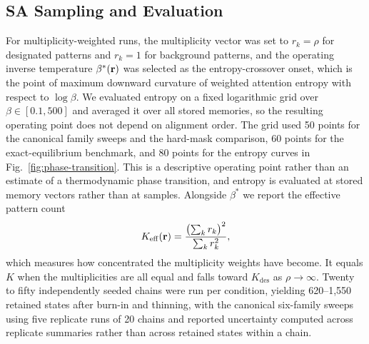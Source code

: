 \subsection{SA Sampling and Evaluation}

For multiplicity-weighted runs, the multiplicity vector was set to $r_k = \rho$ for designated
patterns and $r_k = 1$ for background patterns, and the operating inverse temperature
$\beta^{*}(\mathbf{r})$ was selected as the entropy-crossover onset, which is the point of maximum
downward curvature of weighted attention entropy with respect to $\log\beta$. We evaluated
entropy on a fixed logarithmic grid over $\beta\in[0.1,500]$ and averaged it over all stored
memories, so the resulting operating point does not depend on alignment order. The grid used 50 points
for the canonical family sweeps and the hard-mask comparison, 60 points for the exact-equilibrium
benchmark, and 80 points for the entropy curves in Fig.~\ref{fig:phase-transition}. This is a
descriptive operating point rather than an estimate of a thermodynamic phase transition, and
entropy is evaluated at stored memory vectors rather than at samples. Alongside $\beta^{*}$ we
report the effective pattern count
\begin{equation}\label{eq:k-eff}
  K_{\mathrm{eff}}(\mathbf{r}) = \frac{\bigl(\sum_k r_k\bigr)^{2}}{\sum_k r_k^{2}},
\end{equation}
which measures how concentrated the multiplicity weights have become. It equals $K$ when the
multiplicities are all equal and falls toward $K_{\mathrm{des}}$ as $\rho\rightarrow\infty$. Twenty to fifty independently seeded chains were run per
condition, yielding 620--1{,}550 retained states after burn-in and thinning, with the canonical
six-family sweeps using five replicate runs of 20 chains and reported uncertainty computed
across replicate summaries rather than across retained states within a chain.

